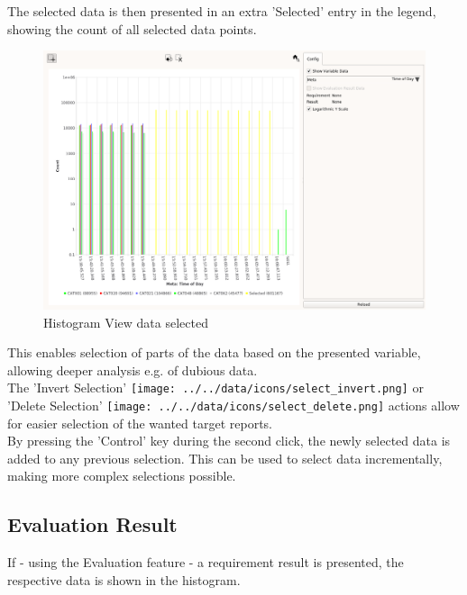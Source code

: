 The selected data is then presented in an extra 'Selected' entry in the legend, showing the count of all selected data points.

\begin{figure}[H]
    \hspace*{-2cm}
    \includegraphics[width=18cm,frame]{figures/histogram_selected.png}
  \caption{Histogram View data selected}
\end{figure}

This enables selection of parts of the data based on the presented variable, allowing deeper analysis e.g. of dubious data. \\

The 'Invert Selection' \texttt{[image: ../../data/icons/select\_invert.png]} or 'Delete Selection' \texttt{[image: ../../data/icons/select\_delete.png]} actions allow for easier selection of the wanted target reports. \\

By pressing the 'Control' key during the second click, the newly selected data is added to any previous selection. This can be used to select data incrementally, making more complex selections possible.

\subsection{Evaluation Result}

If - using the Evaluation feature - a requirement result is presented, the respective data is shown in the histogram.

